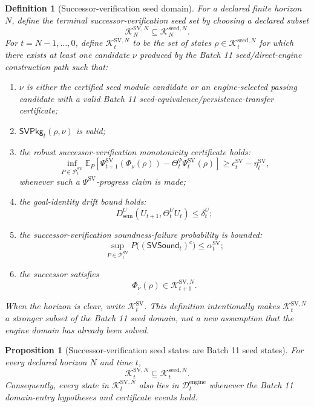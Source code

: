 \documentclass[11pt]{article}
\newtheorem{proposition}[theorem]{Proposition}
\newtheorem{definition}[theorem]{Definition}
\newcommand{\Pcal}{\mathcal{P}}
\newcommand{\1}{\mathbf{1}}
\providecommand{\Dcal}{\mathcal{D}}
\providecommand{\Kcal}{\mathcal{K}}
\providecommand{\sem}{\mathrm{sem}}
\begin{document}
\begin{definition}[Successor-verification seed domain]
\label{def:batch12_successor_verification_seed_domain}
For a declared finite horizon \(N\), define the terminal successor-verification seed set by choosing a declared subset
\[
\Kcal_N^{\mathrm{SV},N}
\subseteq
\Kcal_N^{\mathrm{seed},N}.
\]
For \(t=N-1,\ldots,0\), define \(\Kcal_t^{\mathrm{SV},N}\) to be the set of states \(\rho\in\Kcal_t^{\mathrm{seed},N}\) for which there exists at least one candidate \(\nu\) produced by the Batch 11 seed/direct-engine construction path such that:
\begin{enumerate}[label=(\roman*),leftmargin=1.5em]
    \item \(\nu\) is either the certified seed module candidate or an engine-selected passing candidate with a valid Batch 11 seed-equivalence/persistence-transfer certificate;
    \item \(\mathsf{SVPkg}_t(\rho,\nu)\) is valid;
    \item the robust successor-verification monotonicity certificate holds:
    \[
    \inf_{P\in\Pcal_t^{\mathrm{SV}}}
    \mathbb E_P
    \left[
    \Psi_{t+1}^{\mathrm{SV}}(\Phi_\nu(\rho))
    -
    \Theta_t^\Psi\Psi_t^{\mathrm{SV}}(\rho)
    \right]
    \ge
    \epsilon_t^{\mathrm{SV}}-
    \eta_t^{\mathrm{SV}},
    \]
    whenever such a \(\Psi^{\mathrm{SV}}\)-progress claim is made;
    \item the goal-identity drift bound holds:
    \[
    D_{\sem}^U(U_{t+1},\Theta_t^U U_t)
    \le
    \delta_t^U;
    \]
    \item the successor-verification soundness-failure probability is bounded:
    \[
    \sup_{P\in\Pcal_t^{\mathrm{SV}}}
    P\bigl((\mathsf{SVSound}_t)^c\bigr)
    \le
    \alpha_t^{\mathrm{SV}};
    \]
    \item the successor satisfies
    \[
    \Phi_\nu(\rho)
    \in
    \Kcal_{t+1}^{\mathrm{SV},N}.
    \]
\end{enumerate}
When the horizon is clear, write \(\Kcal_t^{\mathrm{SV}}\).  This definition intentionally makes \(\Kcal_t^{\mathrm{SV},N}\) a stronger subset of the Batch 11 seed domain, not a new assumption that the engine domain has already been solved.
\end{definition}

\begin{proposition}[Successor-verification seed states are Batch 11 seed states]
\label{prop:batch12_sv_seed_subset_seed}
For every declared horizon \(N\) and time \(t\),
\[
\Kcal_t^{\mathrm{SV},N}
\subseteq
\Kcal_t^{\mathrm{seed},N}.
\]
Consequently, every state in \(\Kcal_t^{\mathrm{SV},N}\) also lies in \(\Dcal_t^{\mathrm{engine}}\) whenever the Batch 11 domain-entry hypotheses and certificate events hold.
\end{proposition}
\end{document}
